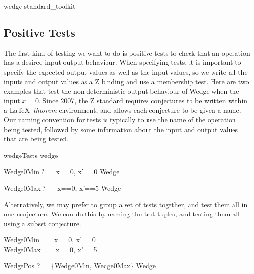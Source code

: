 \documentclass{llncs}
\begin{document}
\begin{zsection}
  \SECTION wedge \parents standard\_toolkit
\end{zsection}

\subsection{Positive Tests}

The first kind of testing we want to do is positive tests to check that an
operation has a desired input-output behaviour.  When specifying
tests, it is important to specify the expected output values as well as the
input values, so we write all the inputs and output values as a Z binding
and use a membership test.  Here are two examples that test the
non-deterministic output behaviour of Wedge when the input $x=0$.
Since 2007, the Z standard requires conjectures to be written within
a \LaTeX\ \emph{theorem} environment, and allows each conjecture to be
given a name.  Our naming convention for tests is typically to use the name
of the operation being tested, followed by some information about the input
and output values that are being tested.

\begin{zsection}
  \SECTION wedgeTests \parents wedge
\end{zsection}

\begin{theorem}{Wedge0Min}
\vdash? ~~ \lblot x==0, x'==0 \rblot \in Wedge
\end{theorem}

\begin{theorem}{Wedge0Max}
\vdash? ~~ \lblot x==0, x'==5 \rblot \in Wedge
\end{theorem}

Alternatively, we may prefer to group a set of tests together, and test
them all in one conjecture.  We can do this by naming the test tuples, and
testing them all using a subset conjecture.

\begin{zed}
  Wedge0Min == \lblot x==0, x'==0 \rblot \\
  Wedge0Max == \lblot x==0, x'==5 \rblot
\end{zed}

\begin{theorem}{WedgePos}
  \vdash? ~~ \{Wedge0Min, Wedge0Max\} \subseteq Wedge
\end{theorem}
\end{document}
